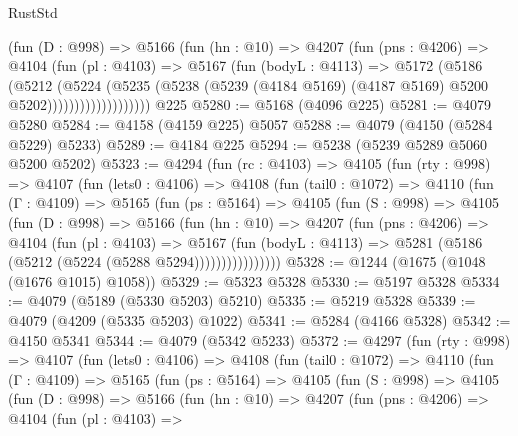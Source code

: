 \begin{lexlean}{RustStd}
\begin{coremodule}
                    (fun (D : @998) =>
                    @5166
                      (fun (hn : @10) =>
                      @4207
                        (fun (pns : @4206) =>
                        @4104
                          (fun (pl : @4103) =>
                          @5167
                            (fun (bodyL : @4113) =>
                            @5172
                              (@5186
                                (@5212
                                  (@5224
                                    (@5235
                                      (@5238
                                        (@5239
                                          (@4184 @5169)
                                          (@4187 @5169)
                                          @5200
                                          @5202)))))))))))))))))))
    @225
@5280 := @5168 (@4096 @225)
@5281 := @4079 @5280
@5284 := @4158 (@4159 @225) @5057
@5288 := @4079 (@4150 (@5284 @5229) @5233)
@5289 := @4184 @225
@5294 := @5238 (@5239 @5289 @5060 @5200 @5202)
@5323 := @4294
    (fun (rc : @4103) =>
    @4105
      (fun (rty : @998) =>
      @4107
        (fun (lets0 : @4106) =>
        @4108
          (fun (tail0 : @1072) =>
          @4110
            (fun (Γ : @4109) =>
            @5165
              (fun (ps : @5164) =>
              @4105
                (fun (S : @998) =>
                @4105
                  (fun (D : @998) =>
                  @5166
                    (fun (hn : @10) =>
                    @4207
                      (fun (pns : @4206) =>
                      @4104
                        (fun (pl : @4103) =>
                        @5167
                          (fun (bodyL : @4113) =>
                          @5281 (@5186 (@5212 (@5224 (@5288 @5294))))))))))))))))
@5328 := @1244 (@1675 (@1048 (@1676 @1015) @1058))
@5329 := @5323 @5328
@5330 := @5197 @5328
@5334 := @4079 (@5189 (@5330 @5203) @5210)
@5335 := @5219 @5328
@5339 := @4079 (@4209 (@5335 @5203) @1022)
@5341 := @5284 (@4166 @5328)
@5342 := @4150 @5341
@5344 := @4079 (@5342 @5233)
@5372 := @4297
    (fun (rty : @998) =>
    @4107
      (fun (lets0 : @4106) =>
      @4108
        (fun (tail0 : @1072) =>
        @4110
          (fun (Γ : @4109) =>
          @5165
            (fun (ps : @5164) =>
            @4105
              (fun (S : @998) =>
              @4105
                (fun (D : @998) =>
                @5166
                  (fun (hn : @10) =>
                  @4207
                    (fun (pns : @4206) =>
                    @4104
                      (fun (pl : @4103) =>

\end{coremodule}
\end{lexlean}
